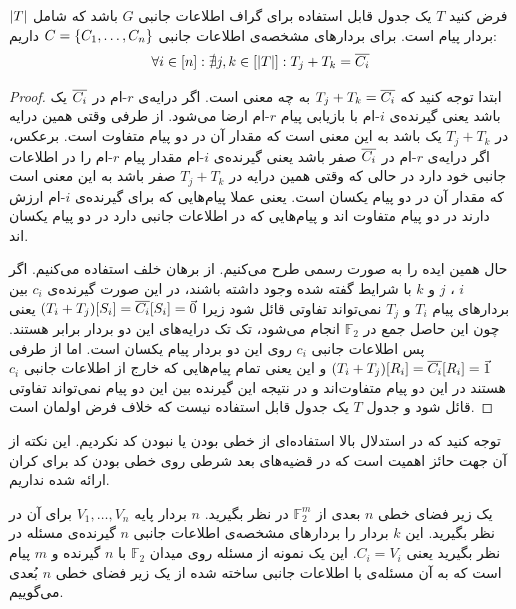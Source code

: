 \begin{lemma}
	\label{lemma:tableconstraint}
	فرض کنید
	$T$
	یک جدول قابل استفاده برای گراف اطلاعات جانبی
	$G$
	باشد که شامل
	$\left|{T}\right|$
	بردار پیام است. برای بردارهای مشخصه‌ی اطلاعات جانبی
	$C = \left\{ C_1, \ldots, C_n \right\}$
	داریم:
	\begin{align}
		\forall i \in [n]: \nexists j, k \in [\left|{T}\right|]: T_j + T_k = \overline{C_i}
	\end{align}
\end{lemma}
\begin{proof}
	ابتدا توجه کنید که
	$T_j + T_k = \overline{C_i}$
	به چه معنی است. اگر درایه‌ی
	$r$-ام
	در
	$\overline{C_i}$
	یک باشد یعنی گیرنده‌ی
	$i$-ام
	با بازیابی پیام
	$r$-ام
	ارضا می‌شود. از طرفی وقتی همین درایه در
	$T_j + T_k$
	یک باشد به این معنی است که مقدار آن در دو پیام متفاوت است. برعکس، اگر درایه‌ی 
	$r$-ام
	در
	$\overline{C_i}$
	صفر باشد یعنی گیرنده‌ی $i$-ام
	مقدار پیام
	$r$-ام
	را در اطلاعات جانبی خود دارد در حالی که وقتی همین درایه در
	$T_j + T_k$
	صفر باشد به این معنی است که مقدار آن در دو پیام یکسان است. یعنی عملا پیام‌هایی که برای گیرنده‌ی
	$i$-ام
	ارزش دارند در دو پیام متفاوت اند و پیام‌هایی که در اطلاعات جانبی دارد در دو پیام یکسان اند.
	
	حال همین ایده را به صورت رسمی طرح می‌کنیم. از برهان خلف استفاده می‌کنیم. اگر
	$i$
	،
	$j$
	و
	$k$
	با شرایط گفته شده وجود داشته باشند، در این صورت گیرنده‌ی
	$c_i$
	بین بردارهای پیام
	$T_i$
	و
	$T_j$
	نمی‌تواند تفاوتی قائل شود زیرا
	$(T_i + T_j)[S_i] = \overline{C_i}[S_i] = \vec{0}$
	یعنی چون این حاصل جمع در
	$\mathbb{F}_2$
	انجام می‌شود، تک تک درایه‌های این دو بردار برابر هستند. پس اطلاعات جانبی
	$c_i$
	روی این دو بردار پیام یکسان است. اما از طرفی
	$(T_i + T_j)[R_i] = \overline{C_i}[R_i] = \vec{1}$
	و این یعنی تمام پیام‌هایی که خارج از اطلاعات جانبی
	$c_i$
	هستند در این دو پیام متفاوت‌اند و در نتیجه این گیرنده بین این دو پیام نمی‌تواند تفاوتی قائل شود و جدول
	$T$
	یک جدول قابل استفاده نیست که خلاف فرض اولمان است.
\end{proof}
\begin{remark}
توجه کنید که در استدلال بالا استفاده‌ای از خطی بودن یا نبودن کد نکردیم. این نکته از آن جهت حائز اهمیت است که در قضیه‌های بعد شرطی روی خطی بودن کد برای کران ارائه شده نداریم.
\end{remark}
\begin{definition}
	\label{def:our:linearspacepicod}
	 یک زیر فضای خطی 
	$n$
	بعدی از
	$\mathbb{F}^m_2$
	در نظر بگیرید.
	$n$
	بردار پایه
	$V_1, \ldots, V_n$
	برای آن در نظر بگیرید. این 
	$k$
	بردار را بردارهای مشخصه‌ی اطلاعات جانبی 
	$n$
	گیرنده‌ی مسئله در نظر بگیرید یعنی
	$C_i = V_i$.
	این یک نمونه از مسئله
	\picod
	روی میدان
	$\mathbb{F}_2$
	با
	$n$
	گیرنده و 
	$m$
	پیام است که به آن مسئله‌ی 
	\picod
	با اطلاعات جانبی ساخته شده از یک زیر فضای خطی
	$n$
	بُعدی می‌گوییم.
\end{definition}

